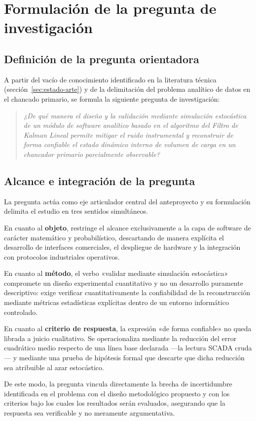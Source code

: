 \section{Formulación de la pregunta de investigación}
\label{sec:pregunta}

\subsection{Definición de la pregunta orientadora}

A partir del vacío de conocimiento identificado en la literatura técnica
(sección~\ref{sec:estado-arte}) y de la delimitación del problema analítico de
datos en el chancado primario, se formula la siguiente pregunta de
investigación:

\begin{quote}
\emph{¿De qué manera el diseño y la validación mediante simulación estocástica
de un módulo de software analítico basado en el algoritmo del Filtro de Kalman
Lineal permite mitigar el ruido instrumental y reconstruir de forma confiable el
estado dinámico interno de volumen de carga en un chancador primario
parcialmente observable?}
\end{quote}

\subsection{Alcance e integración de la pregunta}

La pregunta actúa como eje articulador central del anteproyecto y su formulación
delimita el estudio en tres sentidos simultáneos.

En cuanto al \textbf{objeto}, restringe el alcance exclusivamente a la capa de
software de carácter matemático y probabilístico, descartando de manera
explícita el desarrollo de interfaces comerciales, el despliegue de hardware y
la integración con protocolos industriales operativos.

En cuanto al \textbf{método}, el verbo «validar mediante simulación estocástica»
compromete un diseño experimental cuantitativo y no un desarrollo puramente
descriptivo: exige verificar cuantitativamente la confiabilidad de la
reconstrucción mediante métricas estadísticas explícitas dentro de un entorno
informático controlado.

En cuanto al \textbf{criterio de respuesta}, la expresión «de forma confiable»
no queda librada a juicio cualitativo. Se operacionaliza mediante la reducción
del error cuadrático medio respecto de una línea base declarada —la lectura
SCADA cruda— y mediante una prueba de hipótesis formal que descarte que dicha
reducción sea atribuible al azar estocástico.

De este modo, la pregunta vincula directamente la brecha de incertidumbre
identificada en el problema con el diseño metodológico propuesto y con los
criterios bajo los cuales los resultados serán evaluados, asegurando que la
respuesta sea verificable y no meramente argumentativa.
